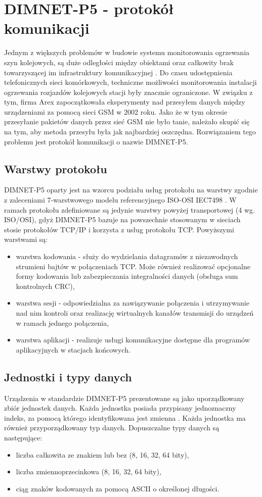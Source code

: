 \section{DIMNET-P5 - protokół komunikacji}
Jednym z większych problemów w budowie systemu monitorowania ogrzewania szyn kolejowych, są duże odległości między obiektami oraz całkowity brak towarzyszącej im infrastruktury komunikacyjnej \cite{dimnetp5-spec}. Do czasu udostępnienia telefonicznych sieci komórkowych, techniczne możliwości monitorowania instalacji ogrzewania rozjazdów kolejowych stacji były znacznie ograniczone. W związku z tym, firma Arex zapoczątkowała eksperymenty nad przesyłem danych między urządzeniami za pomocą sieci GSM w 2002 roku. Jako że w tym okresie przesyłanie pakietów danych przez sieć GSM nie było tanie, należało skupić się na tym, aby metoda przesyłu była jak najbardziej oszczędna. Rozwiązaniem tego problemu jest protokół komunikacji o nazwie DIMNET-P5.

\subsection{Warstwy protokołu}
DIMNET-P5 oparty jest na wzorcu podziału usług protokołu na warstwy zgodnie z zaleceniami 7-warstwowego modelu referencyjnego ISO-OSI IEC7498 \cite{dimnetp5-spec}. W ramach protokołu zdefiniowane są jedynie warstwy powyżej transportowej (4 wg. ISO/OSI), gdyż DIMNET-P5 bazuje na powszechnie stosowanym w sieciach stosie protokołów TCP/IP i korzysta z usług protokołu TCP. Powyższymi warstwami są:
\begin{itemize}
\item warstwa kodowania - służy do wydzielania datagramów z niezawodnych strumieni bajtów w połączeniach TCP. Może również realizować opcjonalne formy kodowania lub zabezpieczania integralności danych (obsługa sum kontrolnych CRC),
\item warstwa sesji - odpowiedzialna za nawiązywanie połączenia i utrzymywanie nad nim kontroli oraz realizację wirtualnych kanałów transmisji do urządzeń w ramach jednego połączenia,
\item warstwa aplikacji - realizuje usługi komunikacyjne dostępne dla programów aplikacyjnych w stacjach końcowych.
\end{itemize}

\subsection{Jednostki i typy danych}
Urządzenia w standardzie DIMNET-P5 prezentowane są jako uporządkowany zbiór jednostek danych. Każda jednostka posiada przypisany jednoznaczny indeks, za pomocą którego identyfikowana jest zmienna \cite{dimnetp5-spec}. Każda jednostka ma również przyporządkowany typ danych. Dopuszczalne typy danych są następujące:
\begin{itemize}
\item liczba całkowita ze znakiem lub bez (8, 16, 32, 64 bity),
\item liczba zmiennoprzecinkowa (8, 16, 32, 64 bity),
\item ciąg znaków kodowanych za pomocą ASCII o określonej długości.
\end{itemize}

